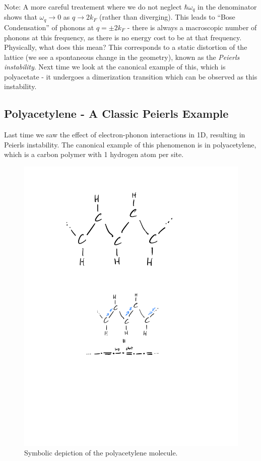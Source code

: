 Note: A more careful treatement where we do not neglect $\hbar \omega_q$ in the denominator shows that $\omega_q \to 0$ as $q \to 2k_F$ (rather than diverging). This leads to ``Bose Condensation'' of phonons at $q = \pm 2k_F$ - there is always a macroscopic number of phonons at this frequency, as there is no energy cost to be at that frequency. Physically, what does this mean? This corresponds to a static distortion of the lattice (we see a spontaneous change in the geometry), known as the \emph{Peierls instability}. Next time we look at the canonical example of this, which is polyacetate - it undergoes a dimerization transition which can be observed as this instability.

\subsection{Polyacetylene - A Classic Peierls Example}
Last time we saw the effect of electron-phonon interactions in 1D, resulting in Peierls instability. The canonical example of this phenomenon is in polyacetylene, which is a carbon polymer with 1 hydrogen atom per site.

\begin{figure}[htbp]
    \centering
    \includegraphics[scale=0.4]{Images/fig-polyacetylene.pdf}
    \caption{Symbolic depiction of the polyacetylene molecule.}
    \label{fig-polyacetylene}
\end{figure}

